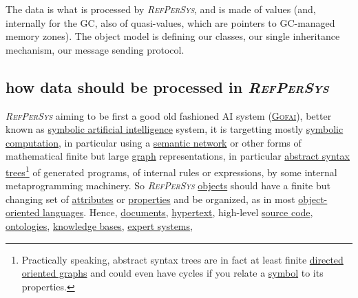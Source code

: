 \documentclass[11pt,a4paper,svgnames]{article}
\newcommand{\RefPerSys}{{\textit{\textsc{RefPerSys}}}}
\begin{document}
The data is what is processed by {\RefPerSys}, and is made of values
(and, internally for the GC, also of quasi-values, which are pointers
to GC-managed memory zones). The object model is defining our classes,
our single inheritance mechanism, our message sending protocol.

\subsection{how data should be processed in \RefPerSys}
\label{subsec:howdata}

{\RefPerSys} aiming to be first a good old fashioned AI system
(\href{http://bootstrappingartificialintelligence.fr/WordPress3/2013/12/the-future-of-ai-is-the-good-old-fashioned-artificial-intelligence/}{\textsc{Gofai}}),
better known as
\href{https://en.wikipedia.org/wiki/Symbolic\_artificial\_intelligence}{symbolic
  artificial intelligence} system, it is targetting mostly
\href{https://en.wikipedia.org/wiki/Computer\_algebra}{symbolic
  computation}, in particular using a
\href{https://en.wikipedia.org/wiki/Semantic\_network}{semantic
  network} or other forms of mathematical finite but large
\href{https://en.wikipedia.org/wiki/Graph\_(discrete\_mathematics)}{graph}
representations, in particular
\href{https://en.wikipedia.org/wiki/Abstract\_syntax\_tree}{abstract
  syntax trees}\footnote{Practically speaking, abstract syntax trees
are in fact at least finite
\href{https://en.wikipedia.org/wiki/Directed_acyclic_graph}{directed
  oriented graphs} and could even have cycles if you relate a
\href{https://en.wikipedia.org/wiki/Symbol\_(programming)}{symbol} to
its properties.} of generated programs, of internal rules or
expressions, by some internal metaprogramming machinery. So
{\RefPerSys}
\href{https://en.wikipedia.org/wiki/Object_(computer_science)}{objects}
should have a finite but changing set of
\href{https://en.wikipedia.org/wiki/Attribute_(computing)}{attributes}
or
\href{https://en.wikipedia.org/wiki/Property_(programming)}{properties}
and be organized, as in most
\href{https://en.wikipedia.org/wiki/Object-oriented_programming}{object-oriented
  languages}. Hence,
\href{https://en.wikipedia.org/wiki/Electronic\_document}{documents},
\href{https://en.wikipedia.org/wiki/Hypertext}{hypertext}, high-level
\href{https://en.wikipedia.org/wiki/Source\_code}{source code},
\href{https://en.wikipedia.org/wiki/Ontology\_(information\_science)}{ontologies},
\href{https://en.wikipedia.org/wiki/Knowledge\_base}{knowledge bases},
\href{https://en.wikipedia.org/wiki/Expert\_system}{expert systems},
\end{document}
